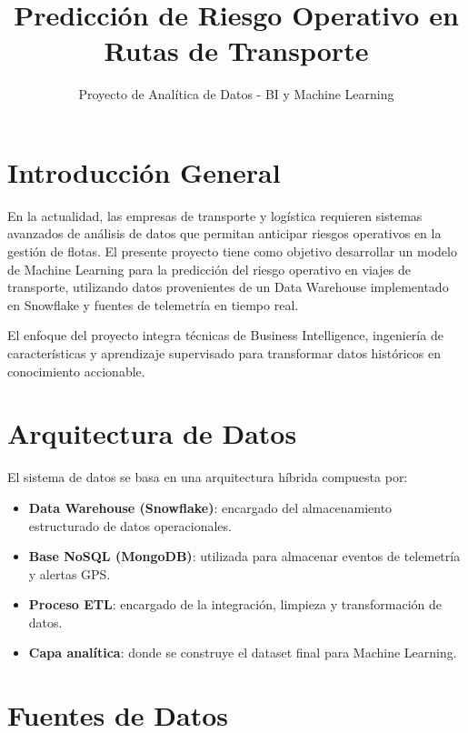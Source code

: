 \documentclass[12pt]{article}
\title{Predicción de Riesgo Operativo en Rutas de Transporte}
\author{Proyecto de Analítica de Datos - BI y Machine Learning}
\date{}
\begin{document}
\maketitle

\section{Introducción General}

En la actualidad, las empresas de transporte y logística requieren sistemas avanzados de análisis de datos que permitan anticipar riesgos operativos en la gestión de flotas. El presente proyecto tiene como objetivo desarrollar un modelo de Machine Learning para la predicción del riesgo operativo en viajes de transporte, utilizando datos provenientes de un Data Warehouse implementado en Snowflake y fuentes de telemetría en tiempo real.

El enfoque del proyecto integra técnicas de Business Intelligence, ingeniería de características y aprendizaje supervisado para transformar datos históricos en conocimiento accionable.

\section{Arquitectura de Datos}

El sistema de datos se basa en una arquitectura híbrida compuesta por:

\begin{itemize}
    \item \textbf{Data Warehouse (Snowflake)}: encargado del almacenamiento estructurado de datos operacionales.
    \item \textbf{Base NoSQL (MongoDB)}: utilizada para almacenar eventos de telemetría y alertas GPS.
    \item \textbf{Proceso ETL}: encargado de la integración, limpieza y transformación de datos.
    \item \textbf{Capa analítica}: donde se construye el dataset final para Machine Learning.
\end{itemize}

\section{Fuentes de Datos}
\end{document}
